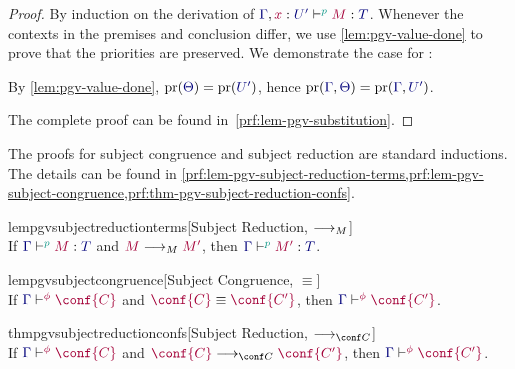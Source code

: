 \documentclass[main.tex]{subfiles}
\begin{document}
  \begin{proof}
    By induction on the derivation of $\tseq[\cs{p}]{\ty{\Gamma},\tmty{x}{U'}}{M}{T}$. Whenever the contexts in the premises and conclusion differ, we use \cref{lem:pgv-value-done} to prove that the priorities are preserved. We demonstrate the case for :
    \begin{case*}
      By \cref{lem:pgv-value-done}, $\pr(\ty{\Theta})=\pr(\ty{U'})$, hence $\pr(\ty{\Gamma},\ty{\Theta})=\pr(\ty{\Gamma},\ty{U'})$.
      \begin{mathpar}
        \small
      \end{mathpar}
    \end{case*}
    The complete proof can be found in~\cref{prf:lem-pgv-substitution}.
  \end{proof}
The proofs for subject congruence and subject reduction are standard inductions. The details can be found in \cref{prf:lem-pgv-subject-reduction-terms,prf:lem-pgv-subject-congruence,prf:thm-pgv-subject-reduction-confs}.
  \begin{restatablelemma}{lempgvsubjectreductionterms}[Subject Reduction, $\tred$]
    \label{lem:pgv-subject-reduction-terms}
    \hfill\\%
    If $\tseq[\cs{p}]{\ty{\Gamma}}{M}{T}$ and $\tm{M}\tred\tm{M'}$,
    then $\tseq[\cs{p}]{\ty{\Gamma}}{M'}{T}$.
  \end{restatablelemma}
  \begin{restatablelemma}{lempgvsubjectcongruence}[Subject Congruence, $\equiv$]
    \label{lem:pgv-subject-congruence}
    \hfill\\%
    If $\cseq[\phi]{\ty{\Gamma}}{\conf{C}}$ and $\tm{\conf{C}}\equiv\tm{\conf{C'}}$,
    then $\cseq[\phi]{\ty{\Gamma}}{\conf{C'}}$.
  \end{restatablelemma}
  \begin{restatabletheorem}{thmpgvsubjectreductionconfs}[Subject Reduction, $\cred$]
    \label{thm:pgv-subject-reduction-confs}
    \hfill\\%
    If $\cseq[\phi]{\ty{\Gamma}}{\conf{C}}$ and $\tm{\conf{C}}\cred\tm{\conf{C'}}$,
    then $\cseq[\phi]{\ty{\Gamma}}{\conf{C'}}$.
  \end{restatabletheorem}
\end{document}
